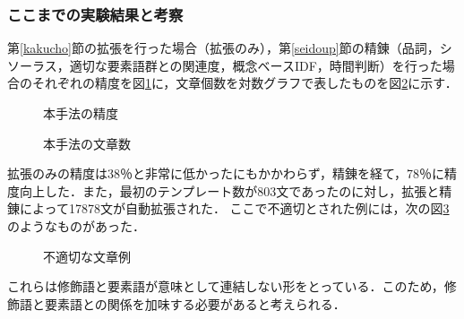 \subsubsection{ここまでの実験結果と考察} \label{seidoA}
第\ref{kakucho}節の拡張を行った場合（拡張のみ），第\ref{seidoup}節の精錬（品詞，シソーラス，適切な要素語群との関連度，概念ベースIDF，時間判断）を行った場合のそれぞれの精度を図\ref{fig:seido1}に，文章個数を対数グラフで表したものを図\ref{fig:number}に示す．
\begin{figure}[htbp]
	\begin{center}
	  	\epsfxsize=8cm
		\caption{本手法の精度}
		\label{fig:seido1}
	\end{center}
\end{figure}
\begin{figure}[htbp]
	\begin{center}
	  	\epsfxsize=8cm
		\caption{本手法の文章数}
		\label{fig:number}
	\end{center}
\end{figure}

拡張のみの精度は38％と非常に低かったにもかかわらず，精錬を経て，78％に精度向上した．また，最初のテンプレート数が803文であったのに対し，拡張と精錬によって17878文が自動拡張された．
ここで不適切とされた例には，次の図\ref{fig:wrong}のようなものがあった．
\begin{figure}[htbp]
	\begin{center}
	  	\epsfxsize=8cm
		\caption{不適切な文章例}
		\label{fig:wrong}
	\end{center}
\end{figure}

これらは修飾語と要素語が意味として連結しない形をとっている．このため，修飾語と要素語との関係を加味する必要があると考えられる．
